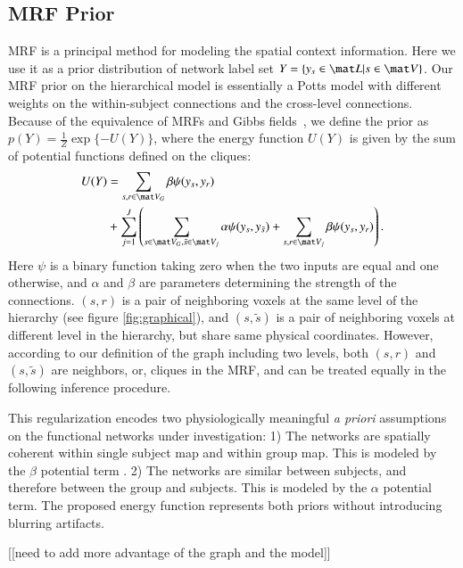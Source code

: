 \documentclass[final,authoryear,5p,twocolumn]{elsarticle}
\begin{document}
\subsection{MRF Prior} 
\label{sec:mrfprior}
MRF is a principal method for modeling the spatial context information. Here we
use it as a prior distribution of network label set $Y = \{y_s \in \mat L| s\in
\mat V \}$.  Our MRF prior on the hierarchical model is essentially a Potts
model \citep{potts1952some} with different weights on the within-subject
connections and the cross-level connections. Because of the equivalence of MRFs
and Gibbs fields~\citep{besag_spatial_1974}, we define the prior as $p(Y) =
\frac{1}{Z}\exp\{ -U(Y)\}$, where the energy function $U(Y)$ is given by the sum
of potential functions defined on the cliques:
\begin{align}
  U(Y) &= \sum_{s,r\in\mat V_G} \beta \psi(y_s, y_r) \nonumber\\
  &+ \sum_{j=1}^J \left ( \sum_{s\in\mat V_G, \tilde s\in\mat V_j} \alpha \psi(y_s, y_{\tilde s}) + \sum_{s,r\in\mat V_j}\beta\psi(y_s, y_r) \right ).\label{eq:energy}
\end{align}
Here $\psi$ is a binary function taking zero when the two inputs are equal and
one otherwise, and $\alpha$ and $\beta$ are parameters determining the strength
of the connections. $(s, r)$ is a pair of neighboring voxels at the same level
of the hierarchy (see figure \ref{fig:graphical}), and $(s, \tilde s)$ is a pair
of neighboring voxels at different level in the hierarchy, but share same
physical coordinates. However, according to our definition of the graph
including two levels, both $(s, r)$ and $(s, \tilde s)$ are neighbors, or,
cliques in the MRF, and can be treated equally in the following inference
procedure.

This regularization encodes two physiologically meaningful
\emph{a priori} assumptions on the functional networks under investigation: 1)
The networks are spatially coherent within single subject map and within group
map. This is modeled by the $\beta$ potential term . 2) The networks are similar
between subjects, and therefore between the group and subjects. This is modeled
by the $\alpha$ potential term.  The proposed energy function represents both
priors without introducing blurring artifacts.

[[need to add more advantage of the graph and the model]]
\end{document}
